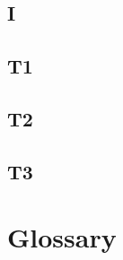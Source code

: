 \documentclass[a4paper,10pt,titlepage,bibtotoc,bibtotocnumbered]{scrreprt}
\begin{document}
\section{I}

\section{T1}

\section{T2}

\section{T3}




\chapter{Glossary}
\end{document}
